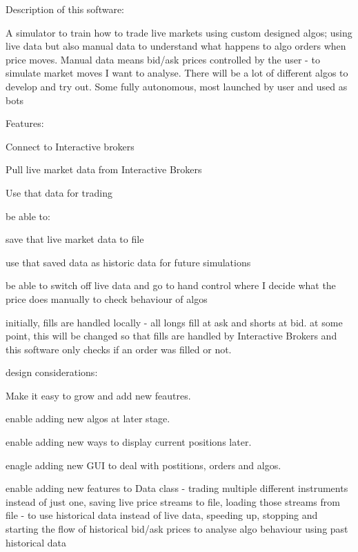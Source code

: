 Description of this software\+:

A simulator to train how to trade live markets using custom designed algos; using live data but also \textquotesingle{}manual data\textquotesingle{} to understand what happens to algo orders when price moves. Manual data means bid/ask prices controlled by the user -\/ to simulate market moves I want to analyse. There will be a lot of different algos to develop and try out. Some fully autonomous, most launched by user and used as \textquotesingle{}bots\textquotesingle{}

Features\+:

Connect to Interactive brokers

Pull live market data from Interactive Brokers

Use that data for trading

be able to\+:

save that live market data to file

use that saved data as historic data for future simulations

be able to switch off live data and go to \textquotesingle{}hand control\textquotesingle{} where I decide what the price does manually to check behaviour of algos

initially, fills are handled locally -\/ all longs fill at ask and shorts at bid. at some point, this will be changed so that fills are handled by Interactive Brokers and this software only checks if an order was filled or not.

design considerations\+:

Make it easy to grow and add new feautres.

enable adding new algos at later stage.

enable adding new ways to display current positions later.

enagle adding new G\+UI to deal with postitions, orders and algos.

enable adding new features to \textquotesingle{}Data\textquotesingle{} class -\/ trading multiple different instruments instead of just one, saving live price streams to file, loading those streams from file -\/ to use historical data instead of live data, \textquotesingle{}speeding up\textquotesingle{}, stopping and starting the flow of historical bid/ask prices to analyse algo behaviour using past historical data 